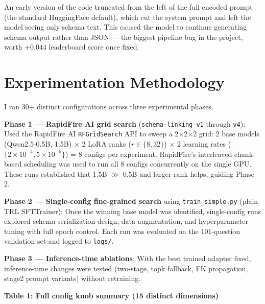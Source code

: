 \documentclass[10pt,twocolumn]{article}
\begin{document}
An early version of the code truncated from the left of the full encoded prompt (the standard HuggingFace default), which cut the system prompt and left the model seeing only schema text. This caused the model to continue generating schema output rather than JSON — the biggest pipeline bug in the project, worth $+0.044$ leaderboard score once fixed.

\section{Experimentation Methodology}

I ran 30+ distinct configurations across three experimental phases.

\textbf{Phase 1 — RapidFire AI grid search} (\texttt{schema-linking-v1} through \texttt{v4}): Used the RapidFire AI \texttt{RFGridSearch} API to sweep a 2$\times$2$\times$2 grid: 2 base models (Qwen2.5-0.5B, 1.5B) $\times$ 2 LoRA ranks ($r \in \{8, 32\}$) $\times$ 2 learning rates ($\{2\times10^{-4}, 5\times10^{-5}\}$) = 8 configs per experiment. RapidFire's interleaved chunk-based scheduling was used to run all 8 configs concurrently on the single GPU. These runs established that 1.5B $\gg$ 0.5B and larger rank helps, guiding Phase 2.

\textbf{Phase 2 — Single-config fine-grained search} using \texttt{train\_simple.py} (plain TRL SFTTrainer): Once the winning base model was identified, single-config runs explored schema serialization design, data augmentation, and hyperparameter tuning with full epoch control. Each run was evaluated on the 101-question validation set and logged to \texttt{logs/}.

\textbf{Phase 3 — Inference-time ablations}: With the best trained adapter fixed, inference-time changes were tested (two-stage, topk fallback, FK propagation, stage2 prompt variants) without retraining.

\vspace{4pt}
\noindent\textbf{Table 1: Full config knob summary (15 distinct dimensions)}
\vspace{2pt}
\end{document}
